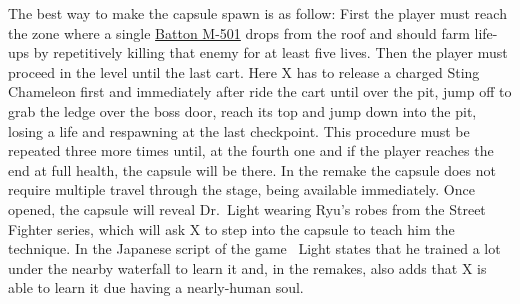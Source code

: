 The best way to make the capsule spawn is as follow: First the player must reach the zone where a single \hyperlink{enem:Batton_M-501}{Batton M-501} drops from the roof  and should farm life-ups by repetitively killing that enemy for at least five lives. Then the player must proceed in the level until the last cart. Here X has to release a charged Sting Chameleon first and immediately after ride the cart until over the pit, jump off to grab the ledge over the boss door, reach its top and jump down into the pit, losing a life and respawning at the last checkpoint. This procedure must be  repeated three more times until, at the  fourth one and if the player reaches the end at full health, the capsule will be there. In the remake the capsule does not require multiple travel through the stage, being available immediately. Once opened, the capsule will reveal Dr.~Light wearing Ryu's robes from the Street Fighter series, which will ask X to step into the capsule to teach him the technique. In the Japanese  script of the game~\cite{wordpress:X_japanese_script} Light states that he trained a lot under the nearby waterfall to learn it and, in the remakes, also adds that X is able to learn it due having a nearly-human soul.


